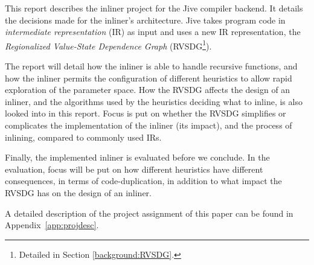 
This report describes the inliner project for the Jive compiler backend. It
details the decisions made for the inliner's architecture. Jive takes program
code in \textit{intermediate representation} (IR) as input and uses a new IR
representation, the \textit{Regionalized Value-State Dependence Graph}
(RVSDG\footnote{Detailed in Section \ref{background:RVSDG}.}).


The report will detail how the inliner is able to handle recursive functions,
and how the inliner permits the configuration of different heuristics to allow
rapid exploration of the parameter space. How the RVSDG affects the design of an
inliner, and the algorithms used by the heuristics deciding what to inline, is
also looked into in this report. Focus is put on whether the RVSDG simplifies or
complicates the implementation of the inliner (its impact), and the process of
inlining, compared to commonly used IRs.

Finally, the implemented inliner is evaluated before we conclude. In the
evaluation, focus will be put on how different heuristics have different
consequences, in terms of code-duplication, in addition to what impact the RVSDG
has on the design of an inliner.

A detailed description of the project assignment of this paper can be found in
Appendix~\ref{app:projdesc}.
